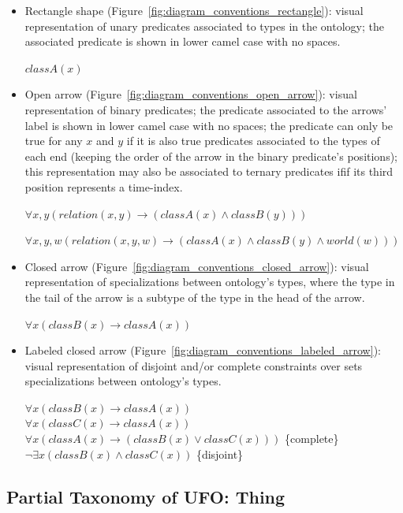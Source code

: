 \documentclass{article}
\newcommand{\me}[1]{\textsf{#1}}
\begin{document}
\begin{itemize}
    \item Rectangle shape (Figure~\ref{fig:diagram_conventions_rectangle}): visual representation of unary predicates associated to types in the ontology; the associated predicate is shown in lower camel case with no spaces.
    
    $classA(x)$

    \item Open arrow (Figure~\ref{fig:diagram_conventions_open_arrow}): visual representation of binary predicates; the predicate associated to the arrows' label is shown in lower camel case with no spaces; the predicate can only be true for any $x$ and $y$ if it is also true predicates associated to the types of each end (keeping the order of the arrow in the binary predicate's positions); this representation may also be associated to ternary predicates ifif its third position represents a time-index.
    
    $\forall x,y (relation(x,y) \rightarrow (classA(x) \wedge classB(y)))$
    
    $\forall x,y,w (relation(x,y,w) \rightarrow (classA(x) \wedge classB(y) \wedge world(w)))$

    \item Closed arrow (Figure~\ref{fig:diagram_conventions_closed_arrow}): visual representation of specializations between ontology's types, where the type in the tail of the arrow is a subtype of the type in the head of the arrow.
    
    $\forall x (classB(x) \rightarrow classA(x))$

    \item Labeled closed arrow (Figure~\ref{fig:diagram_conventions_labeled_arrow}): visual representation of disjoint and/or complete constraints over sets specializations between ontology's types.
    
    $\forall x (classB(x) \rightarrow classA(x))$\\
    $\forall x (classC(x) \rightarrow classA(x))$\\
    $\forall x (classA(x) \rightarrow (classB(x) \vee classC(x)))$  \hfill \{complete\}\\
    $\neg\exists x (classB(x) \wedge classC(x))$  \hfill \{disjoint\}
\end{itemize}

\subsection{Partial Taxonomy of UFO: \me{Thing}}
\end{document}
